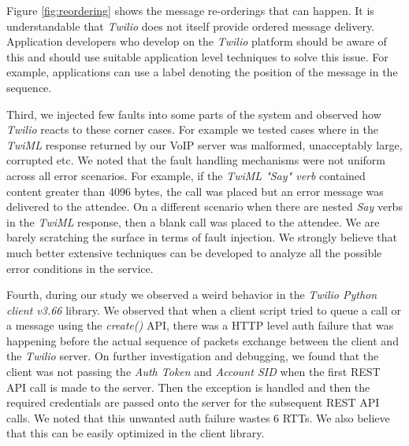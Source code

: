 Figure {\ref{fig:reordering}} shows the message re-orderings that can happen. It is understandable that \textit{Twilio} does not itself provide ordered message delivery. Application developers who develop on the \textit{Twilio} platform should be aware of this and should use suitable application level techniques to solve this issue. For example, applications can use a label denoting the position of the message in the sequence. 

Third, we injected few faults into some parts of the system and observed how \textit{Twilio} reacts to these corner cases. For example we tested cases where in the \textit{TwiML} response returned by our VoIP server was malformed, unacceptably large, corrupted etc. We noted that the fault handling mechanisms were not uniform across all error scenarios. For example, if the \textit{TwiML "Say" verb} contained content greater than 4096 bytes, the call was placed but an error message was delivered to the attendee. On a different scenario when there are nested \textit{Say} verbs in the \textit{TwiML} response, then a blank call was placed to the attendee. We are barely scratching the surface in terms of fault injection. We strongly believe that much better extensive techniques can be developed to analyze all the possible error conditions in the service.  

Fourth, during our study we observed a weird behavior in the \textit{Twilio Python client v3.66} library. We observed that when a client script tried to queue a call or a message using the \textit{create()} API, there was a HTTP level auth failure that was happening before the actual sequence of packets exchange between the client and the \textit{Twilio} server. On further investigation and debugging, we found that the client was not passing the \textit{Auth Token} and \textit{Account SID} when the first REST API call is made to the server. Then the exception is handled and then the required credentials are passed onto the server for the subsequent REST API calls. We noted that this unwanted auth failure wastes 6 RTTs. We also believe that this can be easily optimized in the client library. 

